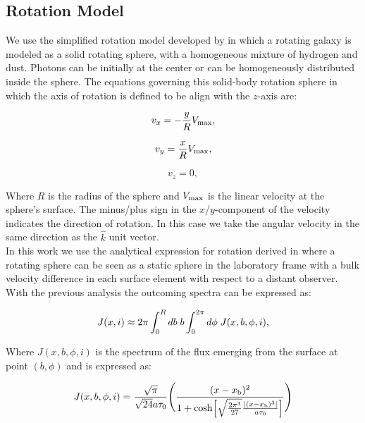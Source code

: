 \documentclass{latex/emulateapj}
\begin{document}
\subsection{Rotation Model}

We use the simplified rotation model developed by \citep{Garavito14} in which a rotating galaxy is modeled as a solid rotating sphere, with a homogeneous mixture of hydrogen and dust. Photons can be initially at the center or can be homogeneously distributed inside the sphere. The equations governing this solid-body rotation sphere in which the axis of rotation is defined to be align with the $z$-axis are:

\begin{equation}
v_{x}=-\frac{y}{R}V_{\rm max}, \label{subeq1}
\end{equation}

\begin{equation}
v_{y}=\frac{x}{R}V_{\rm max}, \label{subeq2}
\end{equation}

\begin{equation}
v_{z}=0, \label{subeq3}
\end{equation}

Where $R$ is the radius of the sphere and $V_{\rm max}$ is the linear velocity at the sphere's surface. The minus/plus sign in the $x$/$y$-component of the velocity indicates the direction of rotation. In this case we take the angular velocity in the same direction as the $\hat{k}$ unit vector.\\

In this work we use the analytical expression for rotation derived in \citep{Garavito14} where a rotating sphere can be seen as a static sphere in the laboratory frame with a bulk velocity difference in each surface element with respect
to a distant observer. With the previous analysis the outcoming spectra can be expressed as:

\begin{equation}
J(x,i) \approx 2\pi \int_0^Rdb \hs b
\int_0^{2\pi}d\phi \hs J(x,b,\phi,i),
\end{equation}

Where $J(x, b, \phi, i)$ is the spectrum of the flux emerging from the surface at point $(b, \phi)$ and is expressed as:

\begin{equation}
J(x,b,\phi,i)=\frac{\sqrt{\pi}}{\sqrt{24}a\tau_0}\Bigg{(}\frac{(x-x_{\rm b})^2}{1+{\rm cosh}\Big{[}\sqrt{\frac{2\pi^3}{27}}\frac{|(x-x_{\rm b})^3|}{a\tau_0}\Big{]}}\Bigg{)}
\end{equation}
\end{document}
